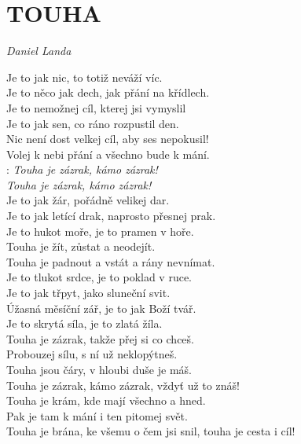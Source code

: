 \section*{\Huge TOUHA}
\emph{Daniel Landa}\\

\begin{Large}

Je to jak nic, to totiž neváží víc.\\
Je to něco jak dech, jak přání na křídlech.\\
Je to nemožnej cíl, kterej jsi vymyslil\\

Je to jak sen, co ráno rozpustil den.\\
Nic není dost velkej cíl, aby ses nepokusil!\\
Volej k nebi přání a všechno bude k mání.\\

\textregistered: \emph{Touha je zázrak, kámo zázrak!\\
Touha je zázrak, kámo zázrak!}\\

Je to jak žár, pořádně velikej dar.\\
Je to jak letící drak, naprosto přesnej prak.\\
Je to hukot moře, je to pramen v hoře.\\

Touha je žít, zůstat a neodejít.\\
Touha je padnout a vstát a rány nevnímat.\\
Je to tlukot srdce, je to poklad v ruce.\\

Je to jak třpyt, jako sluneční svit.\\
Úžasná měsíční zář, je to jak Boží tvář.\\
Je to skrytá síla, je to zlatá žíla.\\

Touha je zázrak, takže přej si co chceš.\\
Probouzej sílu, s ní už neklopýtneš.\\
Touha jsou čáry, v hloubi duše je máš.\\
Touha je zázrak, kámo zázrak, vždyť už to znáš!\\

Touha je krám, kde mají všechno a hned.\\
Pak je tam k mání i ten pitomej svět.\\
Touha je brána, ke všemu o čem jsi snil, touha je cesta i cíl!\\

\textregistered
\end{Large}

\newpage
